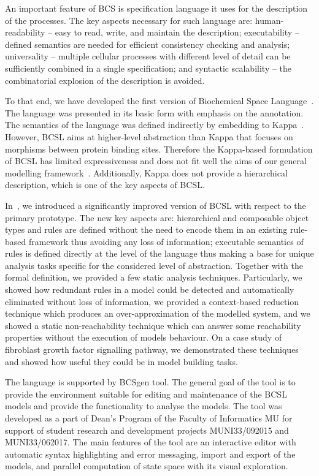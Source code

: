 \documentclass[11pt,a4paper]{report}
\begin{document}
An important feature of BCS is specification language it uses for the description of the processes. The key aspects necessary for such language are: human-readability -- easy to read, write, and maintain the description; executability -- defined semantics are needed for efficient consistency checking and analysis; universality -- multiple cellular processes with different level of detail can be sufficiently combined in a single specification; and syntactic scalability -- the combinatorial explosion of the description is avoided.

To that end, we have developed the first version of Biochemical Space Language~\cite{dved2016formal}. The language was presented in its basic form with emphasis on the annotation. The semantics of the language was defined indirectly by embedding to Kappa~\cite{kappa_formal}. However, BCSL aims at higher-level abstraction than Kappa that focuses on morphisms between protein binding sites. Therefore the Kappa-based formulation of BCSL has limited expressiveness and does not fit well the aims of our general modelling framework~\cite{klement2013comprehensive}. Additionally, Kappa does not provide a hierarchical description, which is one of the key aspects of BCSL.

In~\cite{trojak2018sasb}, we introduced a significantly improved version of BCSL with respect to the primary prototype. The new key aspects are: hierarchical and composable object types and rules are defined without the need to encode them in an existing rule-based framework thus avoiding any loss of information; executable semantics of rules is defined directly at the level of the language thus making a base for unique analysis tasks specific for the considered level of abstraction. Together with the formal definition, we provided a few static analysis techniques. Particularly, we showed how redundant rules in a model could be detected and automatically eliminated without loss of information, we provided a context-based reduction technique which produces an over-approximation of the modelled system, and we showed a static non-reachability technique which can answer some reachability properties without the execution of models behaviour. On a case study of fibroblast growth factor signalling pathway, we demonstrated these techniques and showed how useful they could be in model building tasks.

The language is supported by BCSgen tool. The general goal of the tool is to provide the environment suitable for editing and maintenance of the BCSL models and provide the functionality to analyse the models. The tool was developed as a part of Dean's Program of the Faculty of Informatics MU for support of student research and development projects MUNI33/092015 and MUNI33/062017. The main features of the tool are an interactive editor with automatic syntax highlighting and error messaging, import and export of the models, and parallel computation of state space with its visual exploration.
\end{document}
